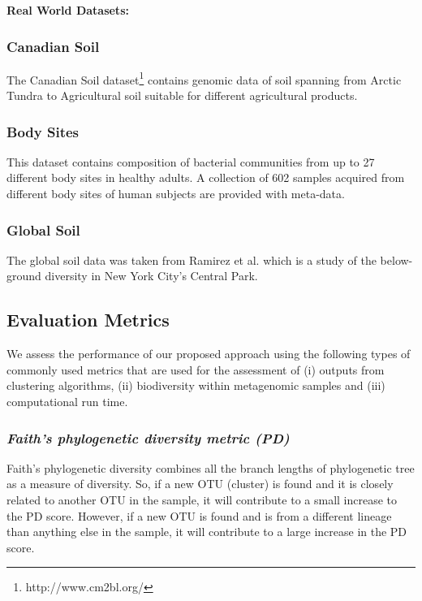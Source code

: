 \documentclass[10pt, conference, compsocconf]{IEEEtran}
\begin{document}
\textbf{Real World Datasets:}

\subsubsection{Canadian Soil}
The Canadian Soil dataset\footnote{http://www.cm2bl.org/} contains 
genomic data of soil spanning from Arctic 
Tundra to Agricultural soil suitable for different 
agricultural products.  %

\subsubsection{Body Sites}
This dataset contains composition of 
bacterial communities from up to 27 different 
body sites in healthy adults. A collection of 602 samples acquired from different body sites of human subjects are provided with meta-data.

\subsubsection{Global Soil}
The global soil data was taken from Ramirez et al. \cite{MARglobalSoil} which is a study of the below-ground diversity in New York City's Central Park. 


\subsection{\textbf{Evaluation Metrics}}

We assess the performance of our proposed approach using 
the following types of commonly used metrics that are used 
for the assessment of (i) outputs from clustering algorithms, (ii) biodiversity
within metagenomic samples and (iii) computational run time. 


\subsubsection{\textit{Faith’s phylogenetic diversity metric (PD)}}
Faith’s phylogenetic diversity \cite{MARfaith1992conservation} combines all 
the branch lengths of phylogenetic tree as a measure of diversity. So, if a new 
OTU (cluster)  is found and it is closely related to another OTU in the sample, it will contribute to 
a small increase to the PD score. However, if a new OTU is found and is 
from a different lineage than anything else in the sample, it will contribute to a large 
increase in the PD score.
\end{document}
